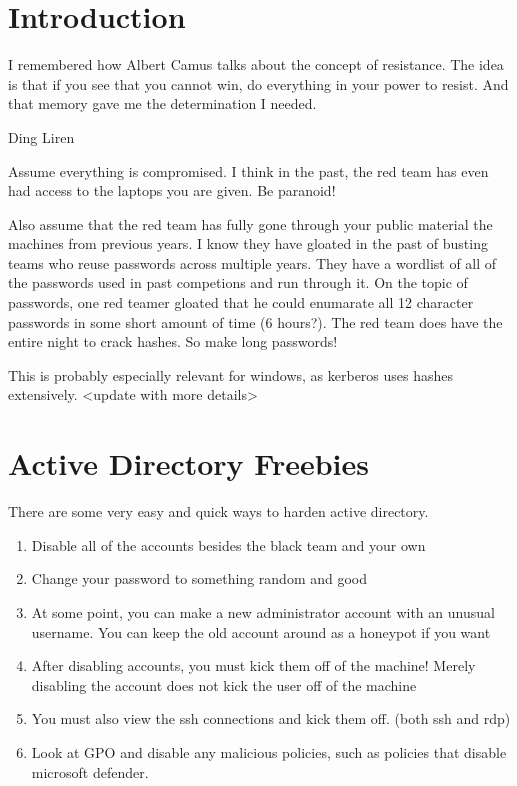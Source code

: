 \documentclass{article}
\begin{document}
\graphicspath{ {./Images/} }
\tableofcontents

\section{Introduction}
\epigraph{I remembered how Albert Camus talks about the concept of resistance. 
The idea is that if you see that you cannot win, do everything in your power to resist. And that memory gave me the determination I needed.}
{Ding Liren}

Assume everything is compromised. I think in the past, the red team has even had access to the laptops you are given. Be paranoid!

Also assume that the red team has fully gone through your public material the machines from previous years.
I know they have gloated in the past of busting teams who reuse passwords across multiple years.
They have a wordlist of all of the passwords used in past competions and run through it. 
On the topic of passwords, one red teamer gloated that he could enumarate all 12 character passwords in some short amount of time (6 hours?).
The red team does have the entire night to crack hashes. So make long passwords!

This is probably especially relevant for windows, as kerberos uses hashes extensively. <update with more details>

\section{Active Directory Freebies}
There are some very easy and quick ways to harden active directory.

\begin{enumerate}
        \item Disable all of the accounts besides the black team and your own
        \item Change your password to something random and good
        \item At some point, you can make a new administrator account with an unusual username. You can keep the old account around as a honeypot if you want
        \item After disabling accounts, you must kick them off of the machine! Merely disabling the account does not kick the user off of the machine
        \item You must also view the ssh connections and kick them off. (both ssh and rdp)
        \item Look at GPO and disable any malicious policies, such as policies that disable microsoft defender.
\end{enumerate}
\end{document}
